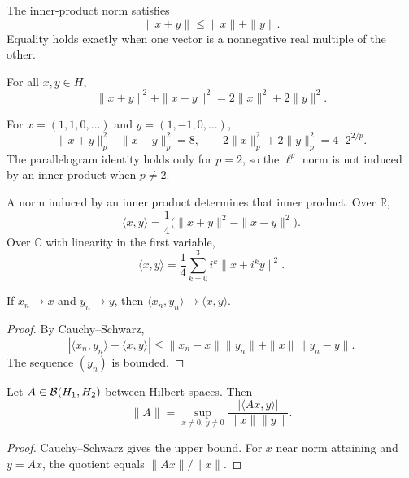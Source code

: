 \begin{notetheorem}
The inner-product norm satisfies
\[
  \|x+y\|\le\|x\|+\|y\|.
\]
Equality holds exactly when one vector is a nonnegative real multiple of the
other.
\end{notetheorem}

\begin{notetheorem}
For all $x,y\in H$,
\[
  \|x+y\|^2+\|x-y\|^2=2\|x\|^2+2\|y\|^2.
\]
\end{notetheorem}

\begin{noteexample}
For $x=(1,1,0,\ldots)$ and $y=(1,-1,0,\ldots)$,
\[
  \|x+y\|_p^2+\|x-y\|_p^2=8,
  \qquad
  2\|x\|_p^2+2\|y\|_p^2=4\cdot2^{2/p}.
\]
The parallelogram identity holds only for $p=2$, so the $\ell^p$ norm is not
induced by an inner product when $p\ne2$.
\end{noteexample}

\begin{notetheorem}
A norm induced by an inner product determines that inner product.  Over
$\mathbb R$,
\[
  \langle x,y\rangle
  =\frac14\bigl(\|x+y\|^2-\|x-y\|^2\bigr).
\]
Over $\mathbb C$ with linearity in the first variable,
\[
  \langle x,y\rangle
  =\frac14\sum_{k=0}^{3}i^k\|x+i^ky\|^2.
\]
\end{notetheorem}

\begin{notelemma}
If $x_n\to x$ and $y_n\to y$, then
$\langle x_n,y_n\rangle\to\langle x,y\rangle$.
\end{notelemma}

\begin{proof}
By Cauchy--Schwarz,
\[
 |\langle x_n,y_n\rangle-\langle x,y\rangle|
 \le\|x_n-x\|\|y_n\|+\|x\|\|y_n-y\|.
\]
The sequence $(y_n)$ is bounded.
\end{proof}

\begin{notetheorem}
Let $A\in\mathcal{B}(H_1,H_2)$ between Hilbert spaces.  Then
\[
  \|A\|
  =\sup_{x\ne0,\,y\ne0}
    \frac{|\langle Ax,y\rangle|}{\|x\|\|y\|}.
\]
\end{notetheorem}

\begin{proof}
Cauchy--Schwarz gives the upper bound.  For $x$ near norm attaining and
$y=Ax$, the quotient equals $\|Ax\|/\|x\|$.
\end{proof}

